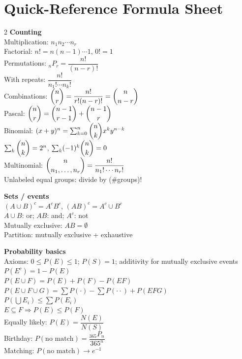 \documentclass[11pt]{article}
\begin{document}
\clearpage
\section{Quick-Reference Formula Sheet}\label{sec:formulas}

\begin{multicols}{2}
\small
\textbf{Counting}\\[2pt]
Multiplication: $n_1n_2\cdots n_r$\\
Factorial: $n!=n(n-1)\cdots1$, $0!=1$\\
Permutations: ${}_nP_r=\dfrac{n!}{(n-r)!}$\\
With repeats: $\dfrac{n!}{n_1!\cdots n_k!}$\\
Combinations: $\dbinom nr=\dfrac{n!}{r!(n-r)!}=\dbinom n{n-r}$\\
Pascal: $\dbinom nr=\dbinom{n-1}{r-1}+\dbinom{n-1}r$\\
Binomial: $(x+y)^n=\sum_{k=0}^n\dbinom nkx^ky^{n-k}$\\
$\sum_k\dbinom nk=2^n$, $\sum_k(-1)^k\dbinom nk=0$\\
Multinomial: $\dbinom n{n_1,\dots,n_r}=\dfrac{n!}{n_1!\cdots n_r!}$\\
Unlabeled equal groups: divide by (\#groups)!

\medskip
\textbf{Sets / events}\\[2pt]
$(A\cup B)^c=A^cB^c$, $(AB)^c=A^c\cup B^c$\\
$A\cup B$: or; $AB$: and; $A^c$: not\\
Mutually exclusive: $AB=\emptyset$\\
Partition: mutually exclusive + exhaustive

\medskip
\textbf{Probability basics}\\[2pt]
Axioms: $0\le P(E)\le1$; $P(S)=1$; additivity for mutually exclusive events\\
$P(E^c)=1-P(E)$\\
$P(E\cup F)=P(E)+P(F)-P(EF)$\\
$P(E\cup F\cup G)=\sum P(\cdot)-\sum P(\cdot\cdot)+P(EFG)$\\
$P(\bigcup E_i)\le\sum P(E_i)$\\
$E\subseteq F\Rightarrow P(E)\le P(F)$\\
Equally likely: $P(E)=\dfrac{N(E)}{N(S)}$\\
Birthday: $P(\text{no match})=\dfrac{{}_{365}P_n}{365^n}$\\
Matching: $P(\text{no match})\to e^{-1}$


\end{multicols}
\end{document}
